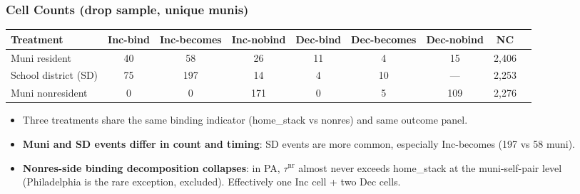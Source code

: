 \documentclass[xcolor = x11names, compress, aspectratio = 169]{beamer}
\begin{document}
    \begin{frame}
    \frametitle{Cell Counts (drop sample, unique munis)}
        \centering
        \footnotesize
        \renewcommand{\arraystretch}{1.20}
        \setlength{\tabcolsep}{6pt}
        \begin{tabular}{lcccccccc}
            \toprule
            Treatment & Inc-bind & Inc-becomes & Inc-nobind & Dec-bind & Dec-becomes & Dec-nobind & NC \\
            \midrule
            Muni resident          & 40  & 58  & 26 & 11 & 4 & 15  & 2{,}406 \\
            School district (SD)   & 75  & 197 & 14 & 4  & 10 & ---  & 2{,}253 \\
            Muni nonresident       & 0   & 0   & 171 & 0  & 5 & 109 & 2{,}276 \\
            \bottomrule
        \end{tabular}
        \medskip
        \begin{itemize}\setlength{\itemsep}{0.04cm}\scriptsize
            \item Three treatments share the same binding indicator
            (home\_stack vs nonres) and same outcome panel.
            \item \textbf{Muni and SD events differ in count and timing}:
            SD events are more common, especially Inc-becomes (197 vs 58 muni).
            \item \textbf{Nonres-side binding decomposition collapses}: in PA,
            $\tau^{\text{nr}}$ almost never exceeds home\_stack at the
            muni-self-pair level (Philadelphia is the rare exception, excluded).
            Effectively one Inc cell + two Dec cells.
        \end{itemize}
    \end{frame}
\end{document}

